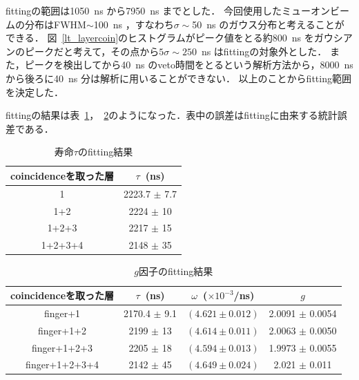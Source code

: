   fittingの範囲は1050~ns から7950~ns までとした． 
  今回使用したミューオンビームの分布はFWHM$\sim$100~ns ，すなわち$\sigma\sim$50~ns のガウス分布と考えることができる．
  図~\ref{lt_layercoin}のヒストグラムがピーク値をとる約800~ns をガウシアンのピークだと考えて，その点から$5\sigma\sim 250$~ns はfittingの対象外とした．
  また，ピークを検出してから40~ns のveto時間をとるという解析方法から，8000~ns から後ろに40~ns 分は解析に用いることができない．
  以上のことからfitting範囲を決定した．
  
  fittingの結果は表~\ref{fit_lt}，~\ref{fit_g}のようになった．表中の誤差はfittingに由来する統計誤差である．
  
  \begin{table}[H]
   \caption{寿命$\tau$のfitting結果}
   \label{fit_lt}
   \begin{center}
    \begin{tabular}{cc}\toprule
     coincidenceを取った層& $\tau$~(ns) \\ \midrule
     1 		        & 2223.7 $\pm$ 7.7 \\
     1+2 		& 2224 $\pm$ 10 \\
     1+2+3 		& 2217 $\pm$ 15 \\
     1+2+3+4 		& 2148 $\pm$ 35\\ \bottomrule
    \end{tabular}
   \end{center}
  \end{table}%
  
  \begin{table}[H]
   \caption{$g$因子のfitting結果}
   \label{fit_g}
   \begin{center}
    \begin{tabular}{cccc}\toprule
     coincidenceを取った層&$\tau$~(ns)& $\omega$~($\times 10^{-3}$/ns) & $g$ \\ \midrule
     finger+1             &2170.4 $\pm$ 9.1 & $( 4.621 \pm 0.012 ) $ & 2.0091 $\pm$ 0.0054 \\
     finger+1+2 	  &2199 $\pm$ 13    & $( 4.614 \pm 0.011 ) $ & 2.0063 $\pm$ 0.0050 \\
     finger+1+2+3 	  &2205 $\pm$ 18    & $( 4.594 \pm 0.013 ) $ & 1.9973 $\pm$ 0.0055\\
     finger+1+2+3+4 	  &2142 $\pm$ 45    & $( 4.649 \pm 0.024 ) $ & 2.021 $\pm$ 0.011 \\ \bottomrule
    \end{tabular}
   \end{center}
  \end{table}%


